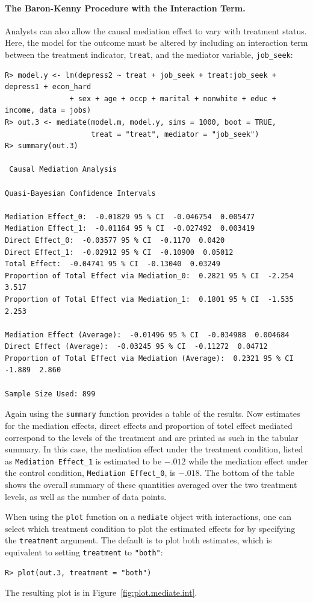 \documentclass[11pt,letterpaper]{article}
\theoremstyle{plain}
\begin{document}
\paragraph{The Baron-Kenny Procedure with the Interaction Term.}
Analysts can also allow the causal mediation effect to vary with
treatment status.  Here, the model for the outcome must be altered by
including an interaction term between the treatment indicator,
\texttt{treat}, and the mediator variable, \texttt{job\_seek}:
\begin{verbatim}
R> model.y <- lm(depress2 ~ treat + job_seek + treat:job_seek + depress1 + econ_hard
               + sex + age + occp + marital + nonwhite + educ + income, data = jobs)
R> out.3 <- mediate(model.m, model.y, sims = 1000, boot = TRUE,
                    treat = "treat", mediator = "job_seek")
R> summary(out.3)

 Causal Mediation Analysis

Quasi-Bayesian Confidence Intervals

Mediation Effect_0:  -0.01829 95 % CI  -0.046754  0.005477
Mediation Effect_1:  -0.01164 95 % CI  -0.027492  0.003419
Direct Effect_0:  -0.03577 95 % CI  -0.1170  0.0420
Direct Effect_1:  -0.02912 95 % CI  -0.10900  0.05012
Total Effect:  -0.04741 95 % CI  -0.13040  0.03249
Proportion of Total Effect via Mediation_0:  0.2821 95 % CI  -2.254  3.517
Proportion of Total Effect via Mediation_1:  0.1801 95 % CI  -1.535  2.253

Mediation Effect (Average):  -0.01496 95 % CI  -0.034988  0.004684
Direct Effect (Average):  -0.03245 95 % CI  -0.11272  0.04712
Proportion of Total Effect via Mediation (Average):  0.2321 95 % CI  -1.889  2.860

Sample Size Used: 899
\end{verbatim}
Again using the \texttt{summary} function provides a table of the
results. Now estimates for the mediation effects, direct effects and
proportion of totel effect mediated correspond
to the levels of the treatment and are printed as such in the tabular
summary.  In this case, the mediation effect under the treatment
condition, listed as \texttt{Mediation Effect\_1} is estimated to be
$-.012$ while the mediation effect under the control condition,
\texttt{Mediation Effect\_0}, is $-.018$.  The bottom of the table shows
the overall summary of these quantities averaged over the two treatment levels,
as well as the number of data points.

When using the {\tt plot} function on a {\tt mediate} object with interactions,
one can select which treatment condition to plot the estimated effects for by
specifying the {\tt treatment} argument.  The default is to plot both estimates,
which is equivalent to setting {\tt treatment} to {\tt "both"}:
\begin{verbatim}
R> plot(out.3, treatment = "both")
\end{verbatim}
The resulting plot is in Figure~\ref{fig:plot.mediate.int}.
\end{document}
